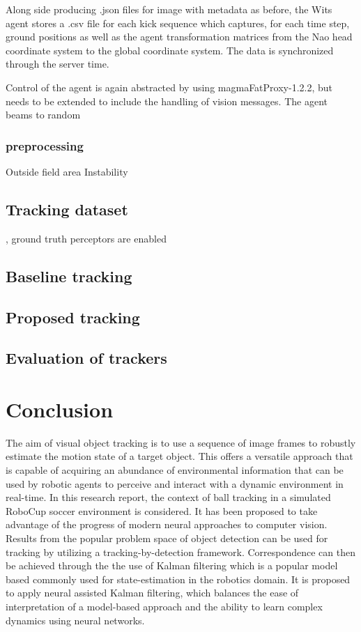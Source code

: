 \documentclass[a4paper,twoside,12pt]{report}
\begin{document}
Along side producing .json files for image with metadata as before, the Wits agent stores a .csv file for each kick sequence which captures, for each time step, ground positions as well as the agent transformation matrices from the Nao head coordinate system to the global coordinate system. The data is synchronized through the server time. 

Control of the agent is again abstracted by using magmaFatProxy-1.2.2, but needs to be extended to include the handling of vision messages. The agent beams to random

\subsection{preprocessing}
Outside field area
Instability

\section{Tracking dataset}
, ground truth perceptors are enabled 

\section{Baseline tracking}

\section{Proposed tracking}

\section{Evaluation of trackers}

\chapter{Conclusion}

The aim of visual object tracking is to use a sequence of image frames to robustly estimate the motion state of a target object. This offers a versatile approach that is capable of acquiring an abundance of environmental information that can be used by robotic agents to perceive and interact with a dynamic environment in real-time. In this research report, the context of ball tracking in a simulated RoboCup soccer environment is considered. It has been proposed to take advantage of the progress of modern neural approaches to computer vision. Results from the popular problem space of object detection can be used for tracking by utilizing a tracking-by-detection framework. Correspondence can then be achieved through the the use of Kalman filtering which is a popular model based commonly used for state-estimation in the robotics domain. It is proposed to apply neural assisted Kalman filtering, which balances the ease of interpretation of a model-based approach and the ability to learn complex dynamics using neural networks. 
\end{document}
